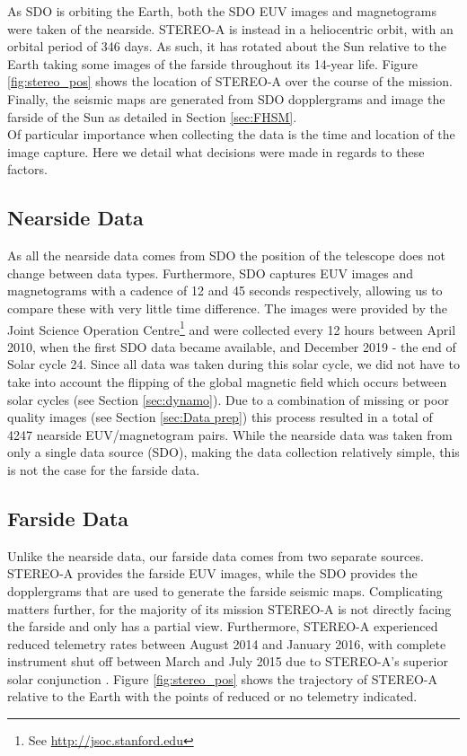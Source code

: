 \documentclass[11pt,a4paper,onecolumn]{report}
\begin{document}
As SDO is orbiting the Earth, both the SDO EUV images and magnetograms were
taken of the nearside. STEREO-A is instead in a heliocentric orbit, with an
orbital period of 346 days. As such, it has rotated about the Sun relative to
the Earth taking some images of the farside throughout its 14-year life.
Figure \ref{fig:stereo_pos} shows the location of STEREO-A over the course of
the mission. Finally, the seismic maps are generated from SDO dopplergrams and
image the farside of the Sun as detailed in Section \ref{sec:FHSM}. \\

Of particular importance when collecting the data is the time and location of
the image capture. Here we detail what decisions were made in regards to these
factors.



\subsection{Nearside Data}
As all the nearside data comes from SDO the position of the telescope does not
change between data types. Furthermore, SDO captures EUV images and magnetograms
with a cadence of 12 and 45 seconds respectively, allowing us to compare these
with very little time difference. The images were provided by the Joint Science
Operation Centre\footnote{See \url{http://jsoc.stanford.edu}} and were
collected every 12 hours between April 2010, when the first SDO data became
available, and December 2019 - the end of Solar cycle 24. Since all data was
taken during this solar cycle, we did not have to take into account the flipping
of the global magnetic field which occurs between solar cycles (see Section
\ref{sec:dynamo}). Due to a combination of missing or poor quality images (see
Section \ref{sec:Data prep}) this process resulted in a total of 4247 nearside
EUV/magnetogram pairs. While the nearside data was taken from only a single data
source (SDO), making the data collection relatively simple, this is not the case
for the farside data.

\subsection{Farside Data}
Unlike the nearside data, our farside data comes from two separate sources.
STEREO-A provides the farside EUV images, while the SDO provides the
dopplergrams that are used to generate the farside seismic maps. Complicating
matters further, for the majority of its mission STEREO-A is not directly
facing the farside and only has a partial view. Furthermore, STEREO-A experienced
reduced telemetry rates between August 2014 and January 2016, with complete
instrument shut off between March and July 2015 due to STEREO-A's superior
solar conjunction \citep{ossing_stereo_2017}. Figure \ref{fig:stereo_pos} shows
the trajectory of STEREO-A relative to the Earth with the points of reduced or no
telemetry indicated. \\
\end{document}

